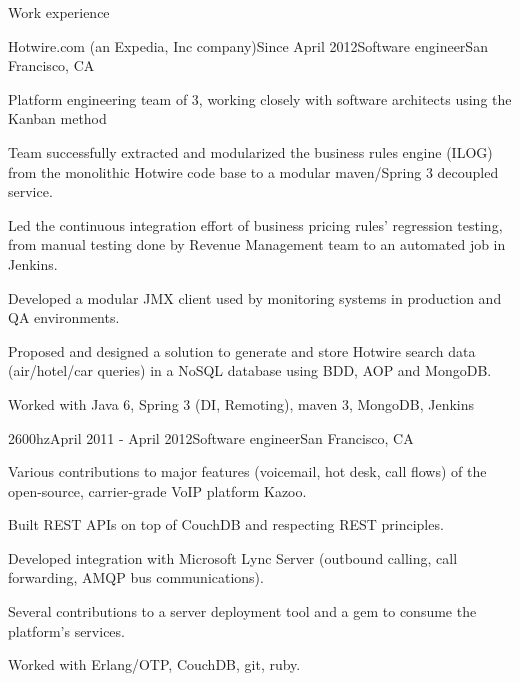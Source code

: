 \documentclass{resume} %
\begin{document}

\begin{rSection}{Work experience}

\begin{rSubsection}{Hotwire.com (an Expedia, Inc company)}{Since April 2012}{Software engineer}{San Francisco, CA}
\item Platform engineering team of 3, working closely with software architects using the Kanban method
\item Team successfully extracted and modularized the business rules engine (ILOG) from the monolithic Hotwire code base to a modular maven/Spring 3 decoupled service.
\item Led the continuous integration effort of business pricing rules' regression testing, from manual testing done by Revenue Management team to an automated job in Jenkins.
\item Developed a modular JMX client used by monitoring systems in production and QA environments.
\item Proposed and designed a solution to generate and store Hotwire search data (air/hotel/car queries) in a NoSQL database using BDD, AOP and MongoDB.
\item Worked with Java 6, Spring 3 (DI, Remoting), maven 3, MongoDB, Jenkins
\end{rSubsection}

\begin{rSubsection}{2600hz}{April 2011 - April 2012}{Software engineer}{San Francisco, CA}
\item Various contributions to major features (voicemail, hot desk, call flows) of the open-source, carrier-grade VoIP platform Kazoo.
\item Built REST APIs on top of CouchDB and respecting REST principles.
\item Developed integration with Microsoft Lync Server (outbound calling, call forwarding, AMQP bus communications).
\item Several contributions to a server deployment tool and a gem to consume the platform's services.
\item Worked with Erlang/OTP, CouchDB, git, ruby.
\end{rSubsection}



\end{rSection}
\end{document}
